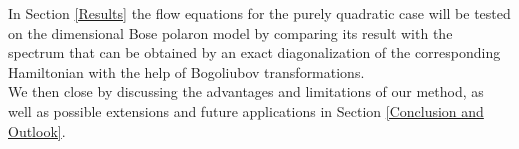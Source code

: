 In Section \ref{Results} the flow equations  for the purely quadratic case will be tested on the dimensional Bose polaron model by comparing its result with the spectrum that can be obtained by an exact diagonalization of the corresponding Hamiltonian with the help of Bogoliubov transformations.\\
We then close by discussing the advantages and limitations of our method, as well as possible extensions and future applications in Section \ref{Conclusion and Outlook}.%
